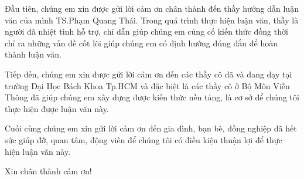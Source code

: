 Đầu tiên, chúng em xin được gửi lời cảm ơn chân thành đến thầy hướng dẫn luận văn của mình TS.Phạm Quang Thái. Trong quá trình thực hiện luận văn, thầy là người đã nhiệt tình hỗ trợ, chỉ dẫn giúp chúng em củng cố kiến thức đồng thời chỉ ra những vấn đề cốt lõi giúp  chúng em có định hướng đúng đắn để hoàn thành luận văn.
\vspace{\baselineskip}

Tiếp đến, chúng em xin được gửi lời cảm ơn đến các thầy cô đã và đang dạy tại trường Đại Học Bách Khoa Tp.HCM và đặc biệt là các thầy cô ở Bộ Môn Viễn Thông đã giúp chúng em xây dựng được kiến thức nền tảng, là cơ sở để chúng tôi thực hiện được luận văn này.
\vspace{\baselineskip}

Cuối cùng chúng em xin gửi lời cảm ơn đến gia đình, bạn bè, đồng nghiệp đã hết sức giúp đỡ, quan tâm, động viên để chúng tôi có điều kiện thuận lợi để thực hiện luận văn này.
\vspace{\baselineskip}


Xin chân thành cảm ơn!
